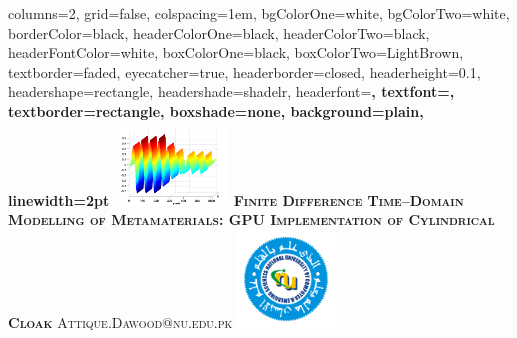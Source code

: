 \documentclass[portrait,final,a1paper,fontscale=0.4]{baposter}
\begin{document}


\begin{poster}%
  {
  columns=2,
  grid=false,
  colspacing=1em,
  bgColorOne=white,
  bgColorTwo=white,
  borderColor=black,
  headerColorOne=black,
  headerColorTwo=black,
  headerFontColor=white,
  boxColorOne=black,
  boxColorTwo=LightBrown,
  textborder=faded,
  eyecatcher=true,
  headerborder=closed,
  headerheight=0.1\textheight,
  headershape=rectangle,
  headershade=shadelr,
  headerfont=\Large\bf\textsc, %
  textfont={\setlength{\parindent}{1.5em}},
  textborder=rectangle,
  boxshade=none,
  background=plain,
  linewidth=2pt
  }
  { 
  \includegraphics[height=6.0em]{Figures/FigCh03_2DDNGSteadyStateLossy}
  } 
  {\bf\textsc{Finite Difference Time--Domain Modelling of Metamaterials: GPU Implementation of Cylindrical Cloak}\vspace{0.2em}}
  {\textsc{Attique.Dawood@nu.edu.pk}\vspace{-0.4em}}
  {%
    \includegraphics[height=7.0em]{Figures/NU_Logo}
  }


\end{poster}
\end{document}
